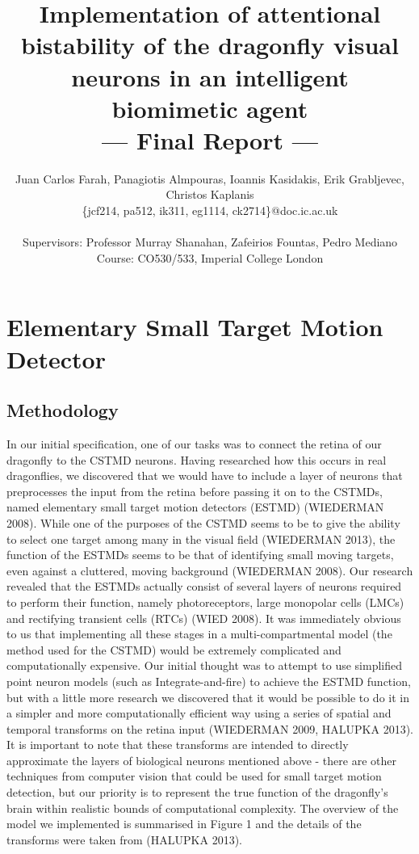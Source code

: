 \documentclass[a4paper,11pt]{article}
\title{Implementation of attentional bistability of the dragonfly visual neurons in an intelligent biomimetic agent\\\Large{--- Final Report ---}}
\author{Juan Carlos Farah, Panagiotis Almpouras, Ioannis Kasidakis, Erik Grabljevec, Christos Kaplanis\\
       \{jcf214, pa512, ik311, eg1114, ck2714\}@doc.ic.ac.uk\\ \\
       \small{Supervisors: Professor Murray Shanahan, Zafeirios Fountas, Pedro Mediano}\\
       \small{Course: CO530/533, Imperial College London}
}
\begin{document}
\section{Elementary Small Target Motion Detector}
\subsection{Methodology}

In our initial specification, one of our tasks was to connect the retina of our dragonfly to the CSTMD neurons. Having researched how this occurs in real dragonflies, we discovered that we would have to include a layer of neurons that preprocesses the input from the retina before passing it on to the CSTMDs, named elementary small target motion detectors (ESTMD) (WIEDERMAN 2008). While one of the purposes of the CSTMD seems to be to give the ability to select one target among many in the visual field (WIEDERMAN 2013), the function of the ESTMDs seems to be that of identifying small moving targets, even against a cluttered, moving background (WIEDERMAN 2008).
\newline
\newline
Our research revealed that the ESTMDs actually consist of several layers of neurons required to perform their function, namely photoreceptors, large monopolar cells (LMCs) and rectifying transient cells (RTCs) (WIED 2008). It was immediately obvious to us that implementing all these stages in a multi-compartmental model (the method used for the CSTMD) would be extremely complicated and computationally expensive. Our initial thought was to attempt to use simplified point neuron models (such as Integrate-and-fire) to achieve the ESTMD function, but with a little more research we discovered that it would be possible to do it in a simpler and more computationally efficient way using a series of spatial and temporal transforms on the retina input (WIEDERMAN 2009, HALUPKA 2013). It is important to note that these transforms are intended to directly approximate the layers of biological neurons mentioned above - there are other techniques from computer vision that could be used for small target motion detection, but our priority is to represent the true function of the dragonfly's brain within realistic bounds of computational complexity. The overview of the model we implemented is summarised in Figure 1 and the details of the transforms were taken from (HALUPKA 2013). 
\end{document}
